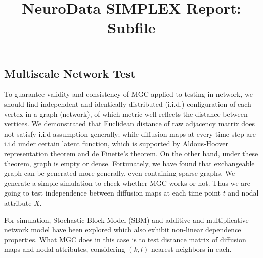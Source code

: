 \documentclass[simplex.tex]{subfiles}
\title{NeuroData SIMPLEX Report: Subfile}
\begin{document}

\subsection{Multiscale Network Test}


To guarantee validity and consistency of MGC applied to testing in
network, we should find independent and identically distributed (i.i.d.)
configuration of each vertex in a graph (network), of which metric well
reflects the distance between vertices. We demonstrated that Euclidean
distance of raw adjacency matrix does not satisfy i.i.d assumption
generally; while diffusion maps at every time step are i.i.d under
certain latent function, which is supported by Aldous-Hoover
representation theorem and de Finette’s theorem. On the other hand,
under these theorem, graph is empty or dense. Fortunately, we have found
that exchangeable graph can be generated more generally, even containing
sparse graphs. We generate a simple simulation to check whether MGC
works or not. Thus we are going to test independence between diffusion
maps at each time point $t$ and nodal attribute $X$. 

For simulation, Stochastic Block Model (SBM) and additive and
multiplicative network model have been explored which also exhibit
non-linear dependence properties. What MGC does in this case is to test
distance matrix of diffusion maps and nodal attributes, considering
$(k,l)$  nearest neighbors in each.
\end{document}

